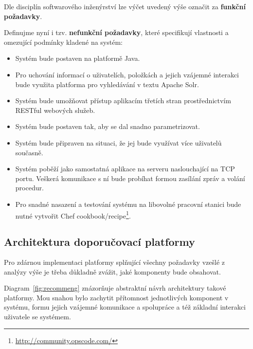 \documentclass[thesis=M,czech]{FITthesis}[2014/05/07]
\begin{document}
Dle disciplín softwarového inženýrství lze výčet uvedený výše označit za \textbf{funkční požadavky}.

Definujme nyní i tzv. \textbf{nefunkční požadavky}, které specifikují vlastnosti a omezující podmínky kladené na systém:

\begin{itemize}
	\item Systém bude postaven na platformě Java.
	\item Pro uchování informací o uživatelích, položkách a jejich vzájemné interakci bude využita platforma pro vyhledávání v textu Apache Solr.
	\item Systém bude umožňovat přístup aplikacím třetích stran prostřednictvím RESTful webových služeb.
	\item Systém bude postaven tak, aby se dal snadno parametrizovat. 
	\item Systém bude připraven na situaci, že jej bude využívat více uživatelů současně.
	\item Systém poběží jako samostatná aplikace na serveru naslouchající na TCP portu. Veškerá komunikace s ní bude probíhat formou zasílání zpráv a volání procedur.
	\item Pro snadné nasazení a testování systému na libovolné pracovní stanici bude nutné vytvořit Chef cookbook/recipe\footnote{\url{http://community.opscode.com/}}.
\end{itemize}

\subsection{Architektura doporučovací platformy}

Pro zdárnou implementaci platformy splňující všechny požadavky vzešlé z analýzy výše je třeba důkladně zvážit, jaké komponenty bude obsahovat.

Diagram~\ref{fig:recommeng} znázorňuje abstraktní návrh architektury takové platformy. Mou snahou bylo zachytit přítomnost jednotlivých komponent v systému, formu jejich vzájemné komunikace a spolupráce a též základní interakci uživatele se systémem.
\end{document}

